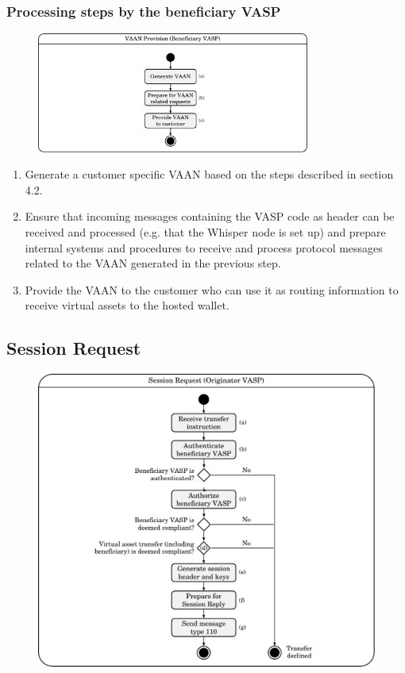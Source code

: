 \documentclass{article}
\begin{document}
\subsubsection{Processing steps by the beneficiary VASP}
\begin{figure}[h]
    \centering
    \includegraphics[width=0.8\textwidth]{g8.pdf}
\end{figure}
\begin{enumerate}
    \item Generate a customer specific VAAN based on the steps described in section 4.2.
    \item Ensure that incoming messages containing the VASP code as header can be received and processed (e.g. that the Whisper node is set up) and prepare internal systems and procedures to receive and process protocol messages related to the VAAN generated in the previous step.
    \item Provide the VAAN to the customer who can use it as routing information to receive virtual assets to the hosted wallet.
\end{enumerate}

\subsection{Session Request}
\begin{figure}[h]
    \centering
    \includegraphics[width=\textwidth]{g9.pdf}
\end{figure}
\end{document}
